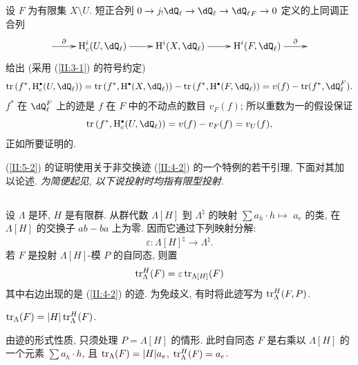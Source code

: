 设 $F$ 为有限集 $X\setminus U$. 短正合列 $0\to j_! \dQ_\ell\to\dQ_\ell\to{\dQ_\ell}_F\to 0$ 定义的上同调正合列
\[\xymatrix{
  \ar[r]^-\partial
    & \h_c^i(U,\dQ_\ell) \ar[r]
    & \h^i(X,\dQ_\ell) \ar[r]
    & \h^i(F,\dQ_\ell) \ar[r]^-\partial
    &
}\]
给出 (采用 (\ref{II:3-1}) 的符号约定)
\[
  \tr\left(f^*,\h_c^\bullet(U,\dQ_\ell)\right)
    = \tr\left(f^*,\h^\bullet(X,\dQ_\ell)\right) - \tr\left(f^*,\h^\bullet(F,\dQ_\ell)\right)
    = v(f) - \tr(f^*,\dQ_\ell^F) \text{.}
\]
$f^*$ 在 $\dQ_\ell^F$ 上的迹是 $f$ 在 $F$ 中的不动点的数目 $v_F(f)$; 所以重数为一的假设保证
\[
  \tr\left(f^*,\h_c^\bullet(U,\dQ_\ell)\right)
    = v(f) - v_F(f) = v_U(f) \text{,}
\]
正如所要证明的.

(\ref{II:5-2}) 的证明使用关于非交换迹 (\ref{II:4-2}) 的一个特例的若干引理, 下面对其加以论述. \emph{为简便起见, 以下说投射时均指有限型投射}.

\subsection{}\label{II:5-5}

设 $\Lambda$ 是环, $H$ 是有限群. 从群代数 $\Lambda[H]$ 到 $\Lambda^\natural$ 的映射 $\sum a_h \cdot h\mapsto $ $a_e$ 的类, 在 $\Lambda[H]$ 的交换子 $ab-ba$ 上为零. 因而它通过下列映射分解:
\[
  \varepsilon : \Lambda[H]^\natural \to \Lambda^\natural \text{.}
\]
若 $F$ 是投射 $\Lambda[H]$-模 $P$ 的自同态, 则置
\[
  \operatorname{tr}_\Lambda^H(F) = \varepsilon \operatorname{tr}_{\Lambda[H]} (F)
\]
其中右边出现的是 (\ref{II:4-2}) 的迹. 为免歧义, 有时将此迹写为 $\operatorname{tr}_\Lambda^H(F,P)$.

\begin{proposition_}\label{II:5-6}
$\operatorname{tr}_\Lambda(F) = |H|\operatorname{tr}_\Lambda^H(F)$.
\end{proposition_}

由迹的形式性质, 只须处理 $P=\Lambda[H]$ 的情形. 此时自同态 $F$ 是右乘以 $\Lambda[H]$ 的一个元素 $\sum a_h\cdot h$, 且 $\operatorname{tr}_\Lambda(F) = |H| a_e$, $\operatorname{tr}_\Lambda^H(F) = a_e$.

\subsection{}\label{II:5-7}

